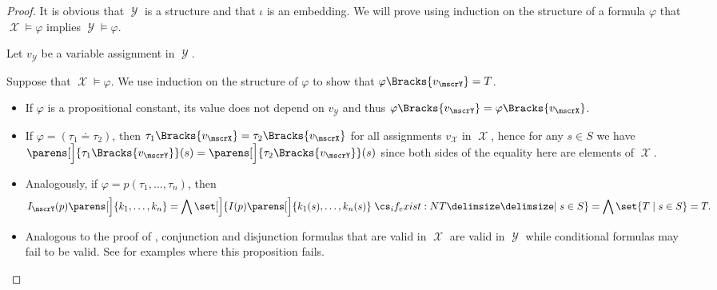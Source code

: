 \begin{proof}
  It is obvious that \( \mscrY \) is a structure and that \( \iota \) is an embedding. We will prove using induction on the structure of a formula \( \varphi \) that \( \mscrX \vDash \varphi \) implies \( \mscrY \vDash \varphi \).

  Let \( v_\mscrY \) be a variable assignment in \( \mscrY \).

  Suppose that \( \mscrX \vDash \varphi \). We use induction on the structure of \( \varphi \) to show that \( \varphi\Bracks{v_\mscrY} = T \).
  \begin{itemize}
    \item If \( \varphi \) is a propositional constant, its value does not depend on \( v_\mscrY \) and thus \( \varphi\Bracks{v_\mscrY} = \varphi\Bracks{v_\mscrX} \).

    \item If \( \varphi = (\tau_1 \doteq \tau_2) \), then \( \tau_1\Bracks{v_\mscrX} = \tau_2\Bracks{v_\mscrX} \) for all assignments \( v_\mscrX \) in \( \mscrX \), hence for any \( s \in S \) we have \( \parens[\Big]{\tau_1\Bracks{v_\mscrY}}(s) = \parens[\Big]{\tau_2\Bracks{v_\mscrY}}(s) \) since both sides of the equality here are elements of \( \mscrX \).

    \item Analogously, if \( \varphi = p(\tau_1, \ldots, \tau_n) \), then
    \begin{equation*}
      I_\mscrY(p) \parens[\Big]{ k_1, \ldots, k_n }
      =
      \bigwedge \set[\Big]{ I(p) \parens[\Big]{ k_1(s), \ldots, k_n(s) } \given* s \in S }
      =
      \bigwedge \set{ T \given s \in S }
      =
      T.
    \end{equation*}

    \item Analogous to the proof of , conjunction and disjunction formulas that are valid in \( \mscrX \) are valid in \( \mscrY \) while conditional formulas may fail to be valid. See  for examples where this proposition fails.
  \end{itemize}
\end{proof}

